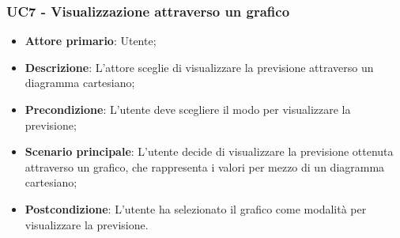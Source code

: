 \subsubsection{UC7 - Visualizzazione attraverso un grafico}
\label{sssec:uc7}
\begin{itemize}
  \item \textbf{Attore primario}: Utente;
  \item \textbf{Descrizione}: L'attore sceglie di visualizzare la previsione attraverso un diagramma cartesiano;
  \item \textbf{Precondizione}: L'utente deve scegliere il modo per visualizzare la previsione;
  \item \textbf{Scenario principale}: L'utente decide di visualizzare la previsione ottenuta attraverso un grafico, che rappresenta i valori per mezzo di un diagramma cartesiano;
  \item \textbf{Postcondizione}: L'utente ha selezionato il grafico come modalità per visualizzare la previsione.
\end{itemize}
